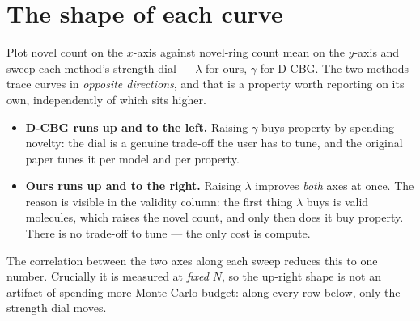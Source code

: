 \documentclass[11pt]{article}
\begin{document}
\section{The shape of each curve}

Plot novel count on the $x$-axis against novel-ring count mean on the $y$-axis and
sweep each method's strength dial --- $\lambda$ for ours, $\gamma$ for D-CBG.
The two methods trace curves in \emph{opposite directions}, and that is a
property worth reporting on its own, independently of which sits higher.

\begin{itemize}
  \item \textbf{D-CBG runs up and to the left.} Raising $\gamma$ buys
        property by spending novelty: the dial is a genuine trade-off the user
        has to tune, and the original paper tunes it per model and per property.
  \item \textbf{Ours runs up and to the right.} Raising $\lambda$ improves
        \emph{both} axes at once. The reason is visible in the validity
        column: the first thing $\lambda$ buys is valid molecules, which raises
        the novel count, and only then does it buy property. There is no
        trade-off to tune --- the only cost is compute.
\end{itemize}

The correlation between the two axes along each sweep reduces this to one
number. Crucially it is measured at \emph{fixed} $N$, so the up-right shape
is not an artifact of spending more Monte Carlo budget: along every row below,
only the strength dial moves.
\end{document}
